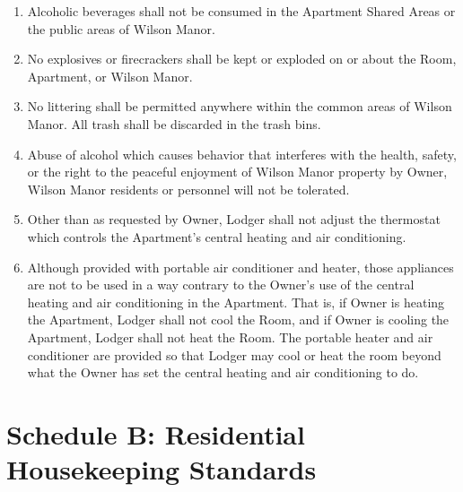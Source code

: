 \documentclass[12pt,letterpaper]{article}
\newcommand{\lodger}{Lodger}
\newcommand{\standards}{Residential Housekeeping Standards}
\newcommand{\condo}{Wilson Manor}
\newcommand{\apt}{Apartment}
\newcommand{\room}{Room}
\newcommand{\shared}{Apartment Shared Areas}
\begin{document}
\begin{enumerate}
		\item Alcoholic beverages shall not be consumed in the \shared{} or the public areas of \condo{}. 
		\item No explosives or firecrackers shall be kept or exploded on or about the \room{}, \apt{}, or \condo{}. 
		\item No littering shall be permitted anywhere within the common areas of \condo{}. All trash shall be discarded in the trash bins. 
		\item Abuse of alcohol which causes behavior that interferes with the health, safety, or the right to the peaceful enjoyment of \condo{} property by Owner, \condo{} residents or personnel will not be tolerated. 
		\item Other than as requested by Owner, \lodger{} shall not adjust the thermostat which controls the \apt{}'s central heating and air conditioning.
		\item Although provided with portable air conditioner and heater, those appliances are not to be used in a way contrary to the Owner's use of the central heating and air conditioning in the \apt{}. That is, if Owner is heating the \apt{}, \lodger{} shall not cool the \room{}, and if Owner is cooling the \apt{}, \lodger{} shall not heat the \room{}. The portable heater and air conditioner are provided so that \lodger{} may cool or heat the room beyond what the Owner has set the central heating and air conditioning to do.
	\end{enumerate}


	\newpage
	\section*{Schedule B: \standards{}} \label{standards}
\end{document}
